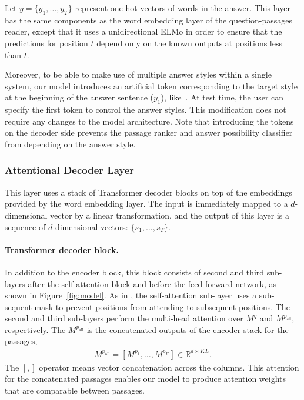 \documentclass[11pt,a4paper]{article}
\theoremstyle{mydef}
\theoremstyle{myprob}
\begin{document}
Let $y = \{y_1, \ldots, y_{T}\}$ represent one-hot vectors of words in the answer. This layer has the same components as the word embedding layer of the question-passages reader, except that it uses a unidirectional ELMo in order to ensure that the predictions for position $t$ depend only on the known outputs at positions less than $t$.

Moreover, to be able to make use of multiple answer styles within a single system, our model introduces an artificial token corresponding to the target style at the beginning of the answer sentence ($y_1$), like~\citep{TakenoNY17}.
At test time, the user can specify the first token to control the answer styles. This modification does not require any changes to the model architecture.  Note that introducing the tokens on the decoder side prevents the passage ranker and answer possibility classifier from depending on the answer style.


\subsubsection{Attentional Decoder Layer}
\label{sec:style}

This layer uses a stack of Transformer decoder blocks on top of the embeddings provided by the word embedding layer. The input is immediately mapped to a $d$-dimensional vector by a linear transformation, and the output of this layer is a sequence of $d$-dimensional vectors: $\{s_1, \ldots, s_T\}$.

\paragraph{Transformer decoder block.} 
In addition to the encoder block, this block consists of second and third sub-layers after the self-attention block and before the feed-forward network, as shown in Figure~\ref{fig:model}. As in \citep{VaswaniSPUJGKP17}, the self-attention sub-layer uses a sub-sequent mask to prevent positions from attending to subsequent positions. The second and third sub-layers perform the multi-head attention over $M^q$ and $M^{p_\mathrm{all}}$, respectively. 
The $M^{p_\mathrm{all}}$ is the concatenated outputs of the encoder stack for the passages, 
\begin{align}
M^{p_\mathrm{all}} = [M^{p_1}, \ldots, M^{p_K}] \in \mathbb{R}^{d \times KL}.
\end{align}
 The $[,]$ operator means vector concatenation across the columns. This attention for the concatenated passages enables our model to produce attention weights that are comparable between passages.
\end{document}

